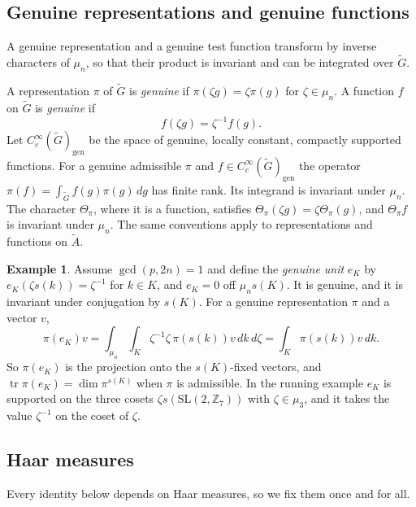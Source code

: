 \documentclass[12pt,letterpaper]{article}
\numberwithin{equation}{section}
\theoremstyle{plain}
\theoremstyle{definition}
\newtheorem{example}[theorem]{Example}
\theoremstyle{remark}
\newcommand{\Gt}{\widetilde G}
\newcommand{\At}{\widetilde A}
\newcommand{\Zz}{\mathbb Z}
\newcommand{\gen}{\mathrm{gen}}
\DeclareMathOperator{\tr}{tr}
\newcommand{\SL}{\mathrm{SL}}
\begin{document}
\subsection{Genuine representations and genuine functions}
\label{subsec:genuine}

A genuine representation and a genuine test function transform by
inverse characters of $\mu_n$, so that their product is invariant and
can be integrated over $\Gt$.

A representation $\pi$ of $\Gt$ is \emph{genuine} if
$\pi(\zeta g)=\zeta\pi(g)$ for $\zeta\in\mu_n$. A function $f$ on
$\Gt$ is \emph{genuine} if
\begin{equation}\label{eq:genuine}
f(\zeta g)=\zeta^{-1}f(g).
\end{equation}
Let $C_c^\infty(\Gt)_\gen$ be the space of genuine, locally constant,
compactly supported functions. For a genuine admissible $\pi$ and
$f\in C_c^\infty(\Gt)_\gen$ the operator
$\pi(f)=\int_{\Gt}f(g)\pi(g)\,dg$ has finite rank. Its integrand is
invariant under $\mu_n$. The character $\Theta_\pi$, where it is a
function, satisfies $\Theta_\pi(\zeta g)=\zeta\Theta_\pi(g)$, and
$\Theta_\pi f$ is invariant under $\mu_n$. The same conventions apply
to representations and functions on $\At$.

\begin{example}\label{ex:eK}
Assume $\gcd(p,2n)=1$ and define the \emph{genuine unit} $e_K$ by
$e_K(\zeta s(k))=\zeta^{-1}$ for $k\in K$, and $e_K=0$ off
$\mu_n s(K)$. It is genuine, and it is invariant under conjugation by
$s(K)$. For a genuine representation $\pi$ and a vector $v$,
\[
\pi(e_K)v=\int_{\mu_n}\int_K\zeta^{-1}\zeta\,\pi(s(k))v\,dk\,d\zeta
=\int_K\pi(s(k))v\,dk .
\]
So $\pi(e_K)$ is the projection onto the $s(K)$-fixed vectors, and
$\tr\pi(e_K)=\dim\pi^{s(K)}$ when $\pi$ is admissible. In the running
example $e_K$ is supported on the three cosets $\zeta s(\SL(2,\Zz_7))$
with $\zeta\in\mu_3$, and it takes the value $\zeta^{-1}$ on the coset
of $\zeta$.
\end{example}

\subsection{Haar measures}\label{subsec:haar}

Every identity below depends on Haar measures, so we fix them once
and for all.
\end{document}
